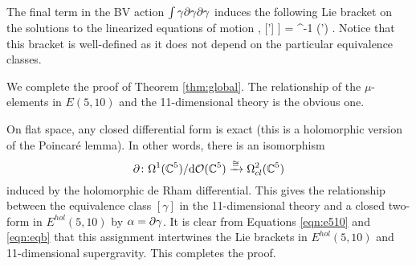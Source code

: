 \documentclass[11pt]{amsart}
\begin{document}
The final term in the BV action $\int \gamma \partial \gamma \partial \gamma$ induces the following Lie bracket on the solutions to the linearized equations of motion
\beqn\label{eqn:eqb}
\big[[\gamma], [\gamma'] \big] = \Omega^{-1} \vee (\del \gamma \wedge \del \gamma') .
\eeqn
Notice that this bracket is well-defined as it does not depend on the particular equivalence classes. 

\parsec[]

We complete the proof of Theorem \ref{thm:global}. 
The relationship of the $\mu$-elements in $E(5,10)$ and the 11-dimensional theory is the obvious one.

On flat space, any closed differential form is exact (this is a holomorphic version of the Poincar\'e lemma). 
In other words, there is an isomorphism
\[
\partial \colon \Omega^1 (\mathbb C^5) / {\rm d} \mathcal O(\mathbb C^5) \xrightarrow{\cong} \Omega^{2}_{cl}(\mathbb C^5)
\]
induced by the holomorphic de Rham differential.
This gives the relationship between the equivalence class $[\gamma]$ in the 11-dimensional theory and a closed two-form in $E^{hol}(5,10)$ by $\alpha = \partial \gamma$. 
It is clear from Equations \eqref{eqn:e510} and \eqref{eqn:eqb} that this assignment intertwines the Lie brackets in $E^{hol}(5,10)$ and 11-dimensional supergravity. 
This completes the proof. 
\end{document}
